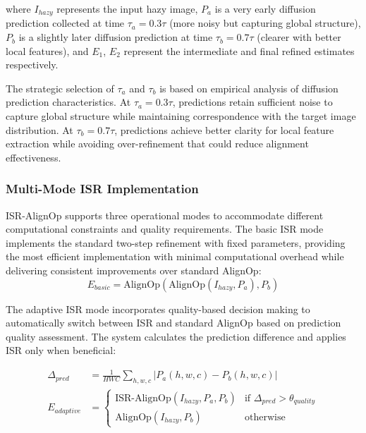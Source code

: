 \documentclass{article}
\begin{document}
where $I_{hazy}$ represents the input hazy image, $P_a$ is a very early diffusion prediction collected at time $\tau_a = 0.3\tau$ (more noisy but capturing global structure), $P_b$ is a slightly later diffusion prediction at time $\tau_b = 0.7\tau$ (clearer with better local features), and $E_1$, $E_2$ represent the intermediate and final refined estimates respectively.

The strategic selection of $\tau_a$ and $\tau_b$ is based on empirical analysis of diffusion prediction characteristics. At $\tau_a = 0.3\tau$, predictions retain sufficient noise to capture global structure while maintaining correspondence with the target image distribution. At $\tau_b = 0.7\tau$, predictions achieve better clarity for local feature extraction while avoiding over-refinement that could reduce alignment effectiveness.

\subsubsection{Multi-Mode ISR Implementation}

ISR-AlignOp supports three operational modes to accommodate different computational constraints and quality requirements. The basic ISR mode implements the standard two-step refinement with fixed parameters, providing the most efficient implementation with minimal computational overhead while delivering consistent improvements over standard AlignOp:
\begin{equation}
E_{basic} = \text{AlignOp}(\text{AlignOp}(I_{hazy}, P_a), P_b)
\end{equation}

The adaptive ISR mode incorporates quality-based decision making to automatically switch between ISR and standard AlignOp based on prediction quality assessment. The system calculates the prediction difference and applies ISR only when beneficial:

\begin{align}
\Delta_{pred} &= \frac{1}{HWC} \sum_{h,w,c} |P_a(h,w,c) - P_b(h,w,c)| \label{eq:pred_diff} \\
E_{adaptive} &= \begin{cases}
\text{ISR-AlignOp}(I_{hazy}, P_a, P_b) & \text{if } \Delta_{pred} > \theta_{quality} \\
\text{AlignOp}(I_{hazy}, P_b) & \text{otherwise}
\end{cases} \label{eq:adaptive_decision}
\end{align}
\end{document}
